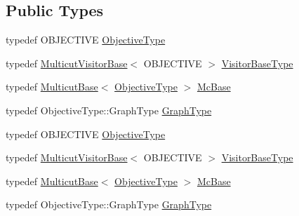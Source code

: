 \subsection*{Public Types}
\begin{DoxyCompactItemize}
\item 
typedef O\+B\+J\+E\+C\+T\+I\+VE \hyperlink{classnifty_1_1graph_1_1opt_1_1multicut_1_1PyMulticutVisitorBase_a53c8ec8368cf8d33b99d6e7214ce2d40}{Objective\+Type}
\item 
typedef \hyperlink{namespacenifty_1_1graph_1_1opt_1_1multicut_a3a8f68d7814a77531781fb55327f05d2}{Multicut\+Visitor\+Base}$<$ O\+B\+J\+E\+C\+T\+I\+VE $>$ \hyperlink{classnifty_1_1graph_1_1opt_1_1multicut_1_1PyMulticutVisitorBase_a4aa5391352d63e29d08754bc0f6f80dd}{Visitor\+Base\+Type}
\item 
typedef \hyperlink{classnifty_1_1graph_1_1opt_1_1multicut_1_1MulticutBase}{Multicut\+Base}$<$ \hyperlink{classnifty_1_1graph_1_1opt_1_1multicut_1_1PyMulticutVisitorBase_a53c8ec8368cf8d33b99d6e7214ce2d40}{Objective\+Type} $>$ \hyperlink{classnifty_1_1graph_1_1opt_1_1multicut_1_1PyMulticutVisitorBase_aa6d9f36fb629bf51dadbc1018595cb14}{Mc\+Base}
\item 
typedef Objective\+Type\+::\+Graph\+Type \hyperlink{classnifty_1_1graph_1_1opt_1_1multicut_1_1PyMulticutVisitorBase_ada1318d86f01ad85d8f61c410b4bdd57}{Graph\+Type}
\item 
typedef O\+B\+J\+E\+C\+T\+I\+VE \hyperlink{classnifty_1_1graph_1_1opt_1_1multicut_1_1PyMulticutVisitorBase_a53c8ec8368cf8d33b99d6e7214ce2d40}{Objective\+Type}
\item 
typedef \hyperlink{namespacenifty_1_1graph_1_1opt_1_1multicut_a3a8f68d7814a77531781fb55327f05d2}{Multicut\+Visitor\+Base}$<$ O\+B\+J\+E\+C\+T\+I\+VE $>$ \hyperlink{classnifty_1_1graph_1_1opt_1_1multicut_1_1PyMulticutVisitorBase_a4aa5391352d63e29d08754bc0f6f80dd}{Visitor\+Base\+Type}
\item 
typedef \hyperlink{classnifty_1_1graph_1_1opt_1_1multicut_1_1MulticutBase}{Multicut\+Base}$<$ \hyperlink{classnifty_1_1graph_1_1opt_1_1multicut_1_1PyMulticutVisitorBase_a53c8ec8368cf8d33b99d6e7214ce2d40}{Objective\+Type} $>$ \hyperlink{classnifty_1_1graph_1_1opt_1_1multicut_1_1PyMulticutVisitorBase_aa6d9f36fb629bf51dadbc1018595cb14}{Mc\+Base}
\item 
typedef Objective\+Type\+::\+Graph\+Type \hyperlink{classnifty_1_1graph_1_1opt_1_1multicut_1_1PyMulticutVisitorBase_ada1318d86f01ad85d8f61c410b4bdd57}{Graph\+Type}
\end{DoxyCompactItemize}
